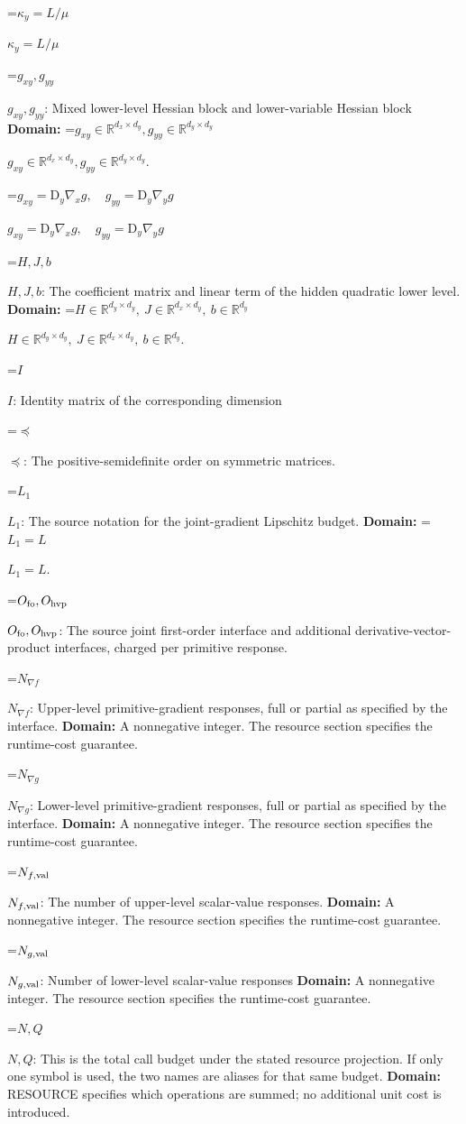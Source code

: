 \documentclass[10pt,a4paper]{article}
\newcommand{\AtlasMath}[1]{\par\begingroup\centering\setbox0=\hbox{$\displaystyle #1$}\ifdim\wd0>1.4\linewidth\typeout{ATLAS WIDE FORMULA: \the\wd0}\fi\ifdim\wd0>\linewidth\resizebox{\linewidth}{!}{\box0}\else\box0\fi\par\endgroup}
\newcommand{\AtlasInlineMath}[1]{\begingroup\setbox0=\hbox{$#1$}\ifdim\wd0>.4\linewidth\endgroup\AtlasMath{#1}\else\endgroup$#1$\fi}
\begin{document}
\AtlasInlineMath{\kappa_y=L/\mu}

\AtlasInlineMath{g_{xy},g_{yy}}: Mixed lower-level Hessian block and lower-variable Hessian block \textbf{Domain:} \AtlasInlineMath{g_{xy}\in\mathbb R^{d_x\times d_y},g_{yy}\in\mathbb R^{d_y\times d_y}}.

\AtlasInlineMath{g_{xy}=\mathrm D_y\nabla_xg,\quad g_{yy}=\mathrm D_y\nabla_yg}

\AtlasInlineMath{H,J,b}: The coefficient matrix and linear term of the hidden quadratic lower level. \textbf{Domain:} \AtlasInlineMath{H\in\mathbb R^{d_y\times d_y},\ J\in\mathbb R^{d_x\times d_y},\ b\in\mathbb R^{d_y}}.

\AtlasInlineMath{I}: Identity matrix of the corresponding dimension

\AtlasInlineMath{\preceq}: The positive-semidefinite order on symmetric matrices.

\AtlasInlineMath{L_1}: The source notation for the joint-gradient Lipschitz budget. \textbf{Domain:} \AtlasInlineMath{L_1=L}.

\AtlasInlineMath{O_{\rm fo},O_{\rm hvp}}: The source joint first-order interface and additional derivative-vector-product interfaces, charged per primitive response.

\AtlasInlineMath{N_{\nabla f}}: Upper-level primitive-gradient responses, full or partial as specified by the interface. \textbf{Domain:} A nonnegative integer. The resource section specifies the runtime-cost guarantee.

\AtlasInlineMath{N_{\nabla g}}: Lower-level primitive-gradient responses, full or partial as specified by the interface. \textbf{Domain:} A nonnegative integer. The resource section specifies the runtime-cost guarantee.

\AtlasInlineMath{N_{f,\rm val}}: The number of upper-level scalar-value responses. \textbf{Domain:} A nonnegative integer. The resource section specifies the runtime-cost guarantee.

\AtlasInlineMath{N_{g,\rm val}}: Number of lower-level scalar-value responses \textbf{Domain:} A nonnegative integer. The resource section specifies the runtime-cost guarantee.

\AtlasInlineMath{N,Q}: This is the total call budget under the stated resource projection. If only one symbol is used, the two names are aliases for that same budget. \textbf{Domain:} RESOURCE specifies which operations are summed; no additional unit cost is introduced.
\end{document}
